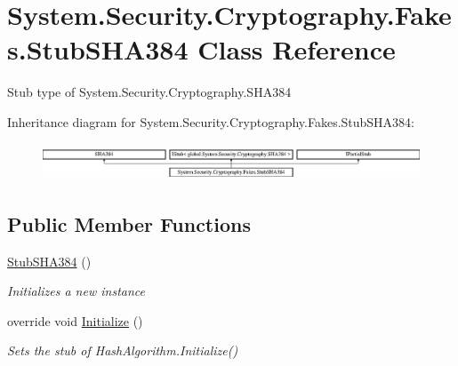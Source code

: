 \hypertarget{class_system_1_1_security_1_1_cryptography_1_1_fakes_1_1_stub_s_h_a384}{\section{System.\-Security.\-Cryptography.\-Fakes.\-Stub\-S\-H\-A384 Class Reference}
\label{class_system_1_1_security_1_1_cryptography_1_1_fakes_1_1_stub_s_h_a384}
}


Stub type of System.\-Security.\-Cryptography.\-S\-H\-A384 


Inheritance diagram for System.\-Security.\-Cryptography.\-Fakes.\-Stub\-S\-H\-A384\-:\begin{figure}[H]
\begin{center}
\leavevmode
\includegraphics[height=1.117764cm]{class_system_1_1_security_1_1_cryptography_1_1_fakes_1_1_stub_s_h_a384}
\end{center}
\end{figure}
\subsection*{Public Member Functions}
\begin{DoxyCompactItemize}
\item 
\hyperlink{class_system_1_1_security_1_1_cryptography_1_1_fakes_1_1_stub_s_h_a384_ad3ede17039fbefc4a968fba2f4926f39}{Stub\-S\-H\-A384} ()
\begin{DoxyCompactList}\small\item\em Initializes a new instance\end{DoxyCompactList}\item 
override void \hyperlink{class_system_1_1_security_1_1_cryptography_1_1_fakes_1_1_stub_s_h_a384_a213b435cc61191ecdd2af3f478cdebd5}{Initialize} ()
\begin{DoxyCompactList}\small\item\em Sets the stub of Hash\-Algorithm.\-Initialize()\end{DoxyCompactList}\end{DoxyCompactItemize}
